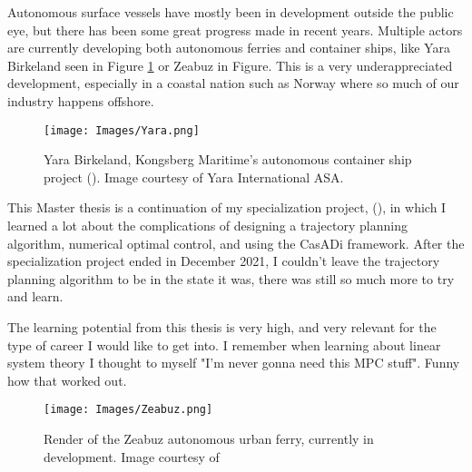 Autonomous surface vessels have mostly been in development outside the public eye, but there has been some great progress made in recent years. 
Multiple actors are currently developing both autonomous ferries and container ships, like Yara Birkeland seen in Figure \ref{FIG: Yara} 
or Zeabuz in Figure. 
This is a very underappreciated development, especially
in a coastal nation such as Norway where so much of our industry happens offshore.

\begin{figure}[h]
    \centering
    \texttt{[image: Images/Yara.png]}
    \caption{Yara Birkeland, Kongsberg Maritime's autonomous container ship project (\cite{KongsbergYara}). Image courtesy of Yara International ASA.}
    \label{FIG: Yara}
\end{figure}

This Master thesis is a continuation of my specialization project, (\cite{Hestvik2021}), in which I learned a lot about the complications
of designing a trajectory planning algorithm, numerical optimal control, and using the CasADi framework. After the specialization project
ended in December 2021, I couldn't leave the trajectory planning algorithm to be in the state it was, there was still so much more to try and learn.

The learning potential from this thesis is very high, and very relevant for the type of career I would like to get into.
I remember when learning about linear system theory I thought to myself "I'm never gonna need this MPC stuff". Funny how that worked out.

\begin{figure}
    \centering
    \texttt{[image: Images/Zeabuz.png]}
    \caption{Render of the Zeabuz autonomous urban ferry, currently in development. Image courtesy of \cite{Zeabuz}}
\end{figure}


